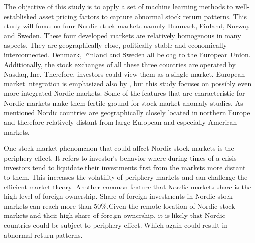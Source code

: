\documentclass[12pt]{article}
\begin{document}
The objective of this study is to apply a set of machine learning methods to well-established asset pricing factors to capture abnormal stock return patterns. This study will focus on four Nordic stock markets namely Denmark, Finland, Norway and Sweden. These four developed markets are relatively homogenous in many aspects. They are geographically close, politically stable and economically interconnected. Denmark, Finland and Sweden all belong to the European Union. Additionally, the stock exchanges of all these three countries are operated by Nasdaq, Inc. Therefore, investors could view them as a single market. European market integration is emphasized also by \citeauthor{FAMA2012457}, but this study focuses on possibly even more integrated Nordic markets.\footnotemark {} Some of the features that are characteristic for Nordic markets make them fertile ground for stock market anomaly studies. As mentioned Nordic countries are geographically closely located in northern Europe and therefore relatively distant from large European and especially American markets.  \par

One stock market phenomenon that could affect Nordic stock markets is the periphery effect.\footnotemark {} It refers to investor's behavior where during times of a crisis investors tend to liquidate their investments first from the markets more distant to them. This increases the volatility of periphery markets and can challenge the efficient market theory. Another common feature that Nordic markets share is the high level of foreign ownership. Share of foreign investments in Nordic stock markets can reach more than 50\%.\footnotemark  Given the remote location of Nordic stock markets and their high share of foreign ownership, it is likely that Nordic countries could be subject to periphery effect. Which again could result in abnormal return patterns. \par

\end{document}
